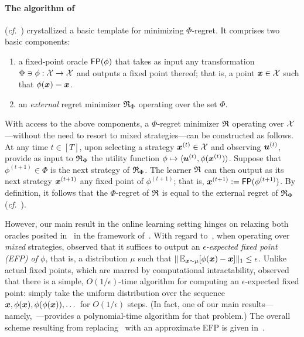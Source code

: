 \paragraph{The algorithm of~\citet{Gordon08:No}} \citet{Gordon08:No} (\emph{cf.}~\citet{Blum07:From,Stoltz05:Internal}) crystallized a basic template for minimizing $\Phi$-regret. It comprises two basic components:
\begin{enumerate}
    \item a fixed-point oracle $\textsf{FP}(\phi)$ that takes as input any transformation $\Phi \ni \phi: {\mathcal{X}} \to {\mathcal{X}}$ and outputs a fixed point thereof; that is, a point ${\bm{x}} \in {\mathcal{X}}$ such that $\phi({\bm{x}}) = {\bm{x}}$.\label{item:gordon1}
    \item an \emph{external} regret minimizer $\mathfrak{R}_{\Phi}$ operating over the set $\Phi$.\label{item:gordon2}
\end{enumerate}
With access to the above components, a $\Phi$-regret minimizer $\mathfrak{R}$ operating over ${\mathcal{X}}$---without the need to resort to mixed strategies---can be constructed as follows. At any time $t \in [T]$, upon selecting a strategy ${\bm{x}}^{(t)} \in {\mathcal{X}}$ and observing ${\bm{u}}^{(t)}$, provide as input to $\mathfrak{R}_\Phi$ the utility function $\phi \mapsto \langle {\bm{u}}^{(t)}, \phi({\bm{x}}^{(t)}) \rangle$. Suppose that $\phi^{(t+1)} \in \Phi$ is the next strategy of $\mathfrak{R}_\Phi$. The learner $\mathfrak{R}$ can then output as its next strategy ${\bm{x}}^{(t+1)}$ any fixed point of $\phi^{(t+1)}$; that is, ${\bm{x}}^{(t+1)} := \textsf{FP}(\phi^{(t+1)})$. By definition, it follows that the $\Phi$-regret of $\mathfrak{R}$ is equal to the external regret of $\mathfrak{R}_\Phi$ (\emph{cf.}~).

However, our main result in the online learning setting hinges on relaxing both oracles posited in~ in the framework of~\citet{Gordon08:No}. With regard to~, when operating over \emph{mixed} strategies, \citet{Zhang24:Efficient} observed that it suffices to output an \emph{$\epsilon$-expected fixed point (EFP) of $\phi$}, that is, a distribution $\mu$ such that $\| \operatorname*{\mathbb E}_{{\bm{x}} \sim \mu} [ \phi({\bm{x}}) - {\bm{x}} ]  \|_1 \leq \epsilon$. Unlike actual fixed points, which are marred by computational intractability, \citet{Zhang24:Efficient} observed that there is a simple, $O(1/\epsilon)$-time algorithm for computing an $\epsilon$-expected fixed point: simply take the uniform distribution over the sequence ${\bm{x}}, \phi({\bm{x}}), \phi(\phi({\bm{x}})), \dots$ for $O(1/\epsilon)$ steps. (In fact, one of our main results---namely,~---provides a polynomial-time algorithm for that problem.) The overall scheme resulting from replacing~ with an approximate EFP is given in~.

